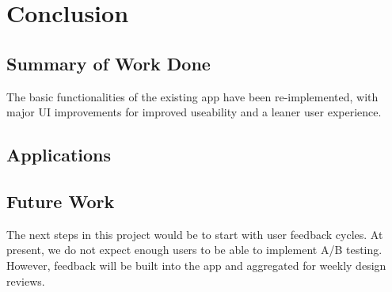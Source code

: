 \chapter{Conclusion}

\label{ch:conclusions}

\section{Summary of Work Done}
The basic functionalities of the existing app have been re-implemented, with major UI improvements for improved useability and a leaner user experience.


\section{Applications}



\section{Future Work}
The next steps in this project would be to start with user feedback cycles. At present, we do not expect enough users to be able to implement A/B testing. However, feedback will be built into the app and aggregated for weekly design reviews.